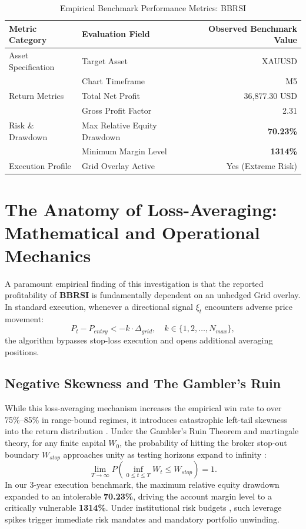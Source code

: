 \documentclass[11pt,a4paper]{article}
\begin{document}
\begin{table}[H]
\centering
\caption{Empirical Benchmark Performance Metrics: BBRSI}
\label{tab:metrics}
\begin{tabular}{llr}
\toprule
\textbf{Metric Category} & \textbf{Evaluation Field} & \textbf{Observed Benchmark Value} \\
\midrule
Asset Specification & Target Asset & XAUUSD \\
& Chart Timeframe & M5 \\
Return Metrics & Total Net Profit & 36,877.30 USD \\
& Gross Profit Factor & 2.31 \\
Risk \& Drawdown & Max Relative Equity Drawdown & \textbf{70.23\%} \\
& Minimum Margin Level & \textbf{1314\%} \\
Execution Profile & Grid Overlay Active & Yes (Extreme Risk) \\
\bottomrule
\end{tabular}
\end{table}


\section{The Anatomy of Loss-Averaging: Mathematical and Operational Mechanics}
A paramount empirical finding of this investigation is that the reported profitability of \textbf{BBRSI} is fundamentally dependent on an unhedged Grid overlay. In standard execution, whenever a directional signal $\xi_t$ encounters adverse price movement:
\begin{equation}
P_t - P_{entry} < -k \cdot \Delta_{grid}, \quad k \in \{1, 2, \dots, N_{max}\},
\end{equation}
the algorithm bypasses stop-loss execution and opens additional averaging positions. 

\subsection{Negative Skewness and The Gambler's Ruin}
While this loss-averaging mechanism increases the empirical win rate to over 75\%--85\% in range-bound regimes, it introduces catastrophic left-tail skewness into the return distribution \cite{bouchaud2003theory, cont2001empirical}. Under the Gambler's Ruin Theorem and martingale theory, for any finite capital $W_0$, the probability of hitting the broker stop-out boundary $W_{stop}$ approaches unity as testing horizons expand to infinity \cite{bouchaud2009markets}:
\begin{equation}
\lim_{T \to \infty} P\left(\inf_{0 \le t \le T} W_t \le W_{stop}\right) = 1.
\end{equation}
In our 3-year execution benchmark, the maximum relative equity drawdown expanded to an intolerable \textbf{70.23\%}, driving the account margin level to a critically vulnerable \textbf{1314\%}. Under institutional risk budgets \cite{rockafellar2000optimization, shleifer1997limits}, such leverage spikes trigger immediate risk mandates and mandatory portfolio unwinding.
\end{document}

